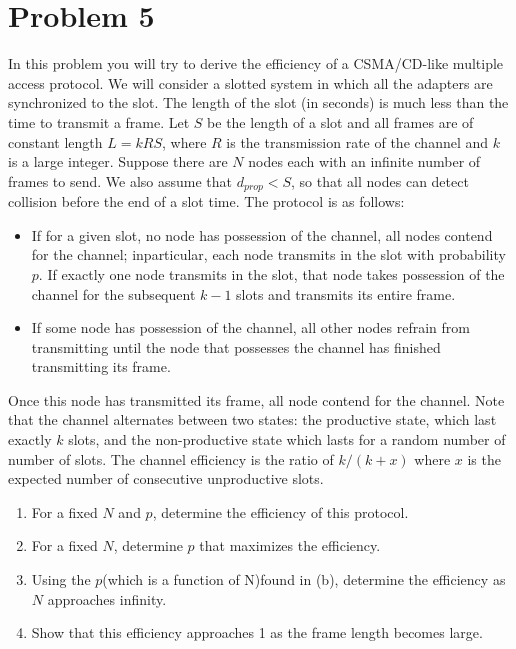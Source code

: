 \section*{Problem 5}

In this problem you will try to derive the efficiency of a CSMA/CD-like multiple access protocol.
We will consider a slotted system in which all the adapters are synchronized to the slot.
The length of the slot (in seconds) is much less than the time to transmit a frame.
Let $S$ be the length of a slot and all frames are of constant length $L=kRS$, where $R$ is the transmission rate of the channel and $k$ is a large integer.
Suppose there are $N$ nodes each with an infinite number of frames to send.
We also assume that $d_{prop} < S$, so that all nodes can detect collision before the end of a slot time.
The protocol is as follows:

\begin{itemize}
    \item If for a given slot, no node has possession of the channel, all nodes contend for the channel; inparticular, each node transmits in the slot with probability $p$.
          If exactly one node transmits in the slot, that node takes possession of the channel for the subsequent $k-1$ slots and transmits its entire frame.
    \item If some node has possession of the channel, all other nodes refrain from transmitting until the node that possesses the channel has finished transmitting its frame.
\end{itemize}

Once this node has transmitted its frame, all node contend for the channel.
Note that the channel alternates between two states: the productive state, which last exactly $k$ slots, and the non-productive state which lasts for a random number of number of slots.
The channel efficiency is the ratio of $k/(k+x)$ where $x$ is the expected number of consecutive unproductive slots.

\begin{enumerate}
    \item For a fixed $N$ and $p$, determine the efficiency of this protocol.
    \item For a fixed $N$, determine $p$ that maximizes the efficiency.
    \item Using the $p$(which is a function of N)found in (b), determine the efficiency as $N$ approaches infinity.
    \item Show that this efficiency approaches 1 as the frame length becomes large.
\end{enumerate}


